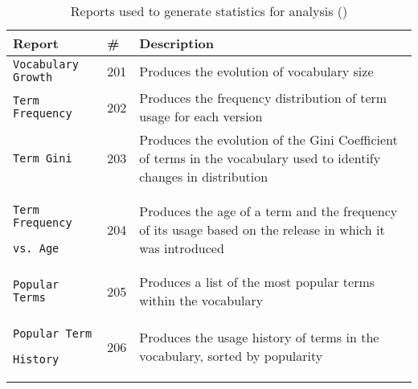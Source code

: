 \begin{table}[t]
\vspace{-3.0cm}
\centering
\begin{tabular}{|p{}|l|p{}|}
\hline
{\bf Report} & {\bf \#} & {\bf Description} \\
\hline \hline 
\texttt{Vocabulary Growth} & 201 & Produces the evolution of vocabulary size \\
\hline
\texttt{Term Frequency} & 202 & Produces the frequency distribution of term usage for each version \\
\hline
\texttt{Term Gini} & 203 & Produces the evolution of the Gini Coefficient of terms in the vocabulary used to identify changes in distribution \\
\hline
\texttt{Term Frequency} \par \texttt{vs. Age} & 204 & Produces the age of a term and the frequency of its usage based on the release in which it was introduced \\
\hline
\texttt{Popular Terms} & 205 & Produces a list of the most popular terms within the vocabulary \\
\hline
\texttt{Popular Term} \par \texttt{History} & 206 & Produces the usage history of terms in the vocabulary, sorted by popularity \\
\hline

\end{tabular}
\caption{Reports used to generate statistics for analysis ()}
\label{tab:vocabulary_reports}
\end{table}

